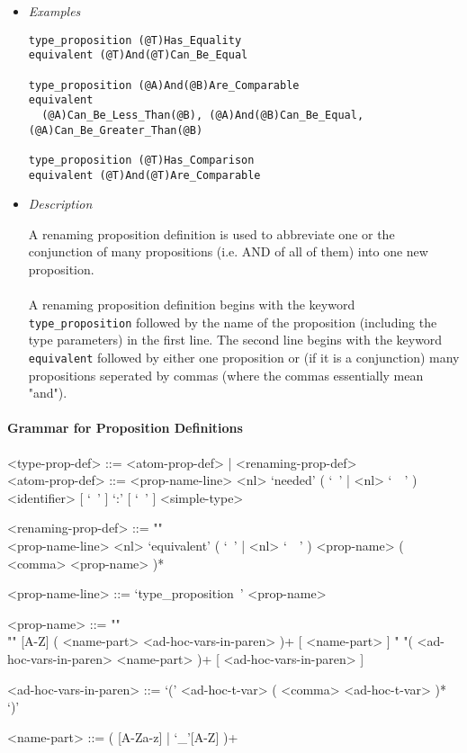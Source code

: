 \documentclass{article}
\begin{document}
\begin{itemize}
\item \textit{Examples}
\begin{verbatim}
type_proposition (@T)Has_Equality
equivalent (@T)And(@T)Can_Be_Equal

type_proposition (@A)And(@B)Are_Comparable
equivalent
  (@A)Can_Be_Less_Than(@B), (@A)And(@B)Can_Be_Equal, (@A)Can_Be_Greater_Than(@B)

type_proposition (@T)Has_Comparison
equivalent (@T)And(@T)Are_Comparable
\end{verbatim}

\item \textit{Description}

A renaming proposition definition is used to abbreviate one or the conjunction
of many propositions (i.e. AND of all of them) into one new proposition.
\\\\
A renaming proposition definition begins with the keyword
\texttt{type_proposition} followed by the name of the proposition (including
the type parameters) in the first line. The second line begins with the keyword
\texttt{equivalent} followed by either one proposition or (if it is a
conjunction) many propositions seperated by commas (where the commas
essentially mean "and").

\end{itemize}

\paragraph{Grammar for Proposition Definitions}

\begin{grammar}
<type-prop-def> ::= <atom-prop-def> | <renaming-prop-def>
\\

<atom-prop-def> ::=
<prop-name-line> <nl>
`needed' ( `\ ' | <nl> `\ \ ' ) <identifier> [ `\ ' ] `:' [ `\ ' ] <simple-type>

<renaming-prop-def> ::= ""\\
<prop-name-line> <nl>
`equivalent' ( `\ ' | <nl> `\ \ ' ) <prop-name> ( <comma> <prop-name> )*

<prop-name-line> ::= `type_proposition\ ' <prop-name>

<prop-name> ::=  ""\\""
[A-Z] ( <name-part> <ad-hoc-vars-in-paren> )+ [ <name-part> ]
\alt " "( <ad-hoc-vars-in-paren> <name-part> )+ [ <ad-hoc-vars-in-paren> ]

<ad-hoc-vars-in-paren> ::= `(' <ad-hoc-t-var> ( <comma> <ad-hoc-t-var> )* `)'

<name-part> ::= ( [A-Za-z] | `_'[A-Z] )+
\end{grammar} 
\end{document}
